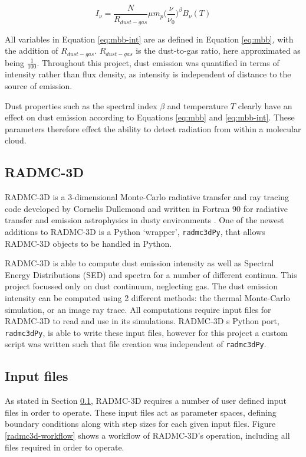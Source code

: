 \documentclass{report}
\begin{document}
\begin{equation} \label{eq:mbb-int}
  I_{\nu} = \frac{N}{R_{dust-gas}} \mu m_{p} \Big(\frac{\nu}{\nu_{0}}\Big)^{\beta} B_{\nu}(T)
\end{equation}

All variables in Equation \ref{eq:mbb-int} are as defined in Equation \ref{eq:mbb}, with the addition of $R_{dust-gas}$. $R_{dust-gas}$ is the dust-to-gas ratio, here approximated as being $\frac{1}{100}$. Throughout this project, dust emission was quantified in terms of intensity rather than flux density, as intensity is independent of distance to the source of emission.

Dust properties such as the spectral index $\beta$ and temperature $T$ clearly have an effect on dust emission according to Equations \ref{eq:mbb} and \ref{eq:mbb-int}. These parameters therefore effect the ability to detect radiation from within a molecular cloud.

\subsection{RADMC-3D} \label{radmc}
RADMC-3D is a 3-dimensional Monte-Carlo radiative transfer and ray tracing code developed by Cornelis Dullemond and written in Fortran 90 for radiative transfer and emission astrophysics in dusty environments \parencite{RADMC-3D}. One of the newest additions to RADMC-3D is a Python ‘wrapper’, \texttt{radmc3dPy}, that allows RADMC-3D objects to be handled in Python.

RADMC-3D is able to compute dust emission intensity as well as Spectral Energy Distributions (SED) and spectra for a number of different continua. This project focussed only on dust continuum, neglecting gas. The dust emission intensity can be computed using 2 different methods: the thermal Monte-Carlo simulation, or an image ray trace. All computations require input files for RADMC-3D to read and use in its simulations. RADMC-3D \textquotesingle s Python port, \texttt{radmc3dPy}, is able to write these input files, however for this project a custom script was written such that file creation was independent of \texttt{radmc3dPy}.

\subsection{Input files} \label{inp}
As stated in Section \ref{radmc}, RADMC-3D requires a number of user defined input files in order to operate. These input files act as parameter spaces, defining boundary conditions along with step sizes for each given input files. Figure \ref{radmc3d-workflow} shows a workflow of RADMC-3D's operation, including all files required in order to operate.
\end{document}
